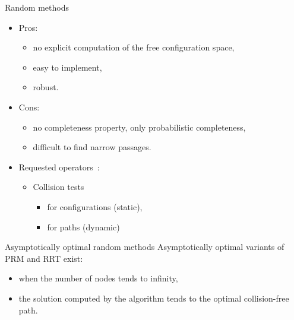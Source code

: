 \begin{frame} {Random methods}
  \begin{itemize}
  \item Pros:
    \begin{itemize}
    \item no explicit computation of the free configuration space,
    \item easy to implement,
    \item robust.
    \end{itemize}
    \pause
  \item Cons:
    \begin{itemize}
    \item no completeness property, only probabilistic completeness,
    \item difficult to find narrow passages.
    \end{itemize}
    \pause
  \item Requested operators~:
    \begin{itemize}
    \item Collision tests
      \begin{itemize}
      \item for configurations (static),
      \item for paths (dynamic)
      \end{itemize}
    \end{itemize}
  \end{itemize}
\end{frame}

%
%

\begin{frame} {Asymptotically optimal random methods}
  Asymptotically optimal variants of PRM and RRT exist:
  \begin{itemize}
  \item when the number of nodes tends to infinity,
  \item the solution computed by the algorithm tends to the optimal
    collision-free path.
  \end{itemize}
\end{frame}

%
%

